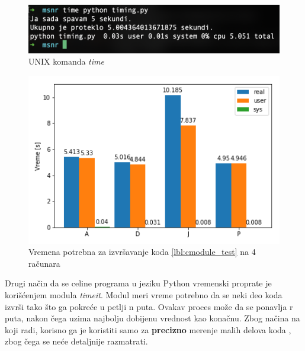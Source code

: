 \documentclass[a4paper]{article}
\begin{document}
\begin{figure}[h!]
\begin{center}
\includegraphics[scale=0.6]{time_python_shell.png}
\end{center}
\caption{UNIX komanda {\em time}}
\label{fig:time_shell}
\end{figure}

\begin{figure}[h!]
\begin{center}
\includegraphics[scale=0.7]{barplot.png}
\end{center}
\caption{Vremena potrebna za izvršavanje koda \ref{lbl:cmodule_test} na 4 računara}
\label{fig:custom_time}
\end{figure}


Drugi način da se celine programa u jeziku Python vremenski proprate je korišćenjem modula {\em timeit}. Modul meri vreme potrebno da se neki deo koda izvrši tako što ga pokreće u petlji n puta. Ovakav proces može da se ponavlja r puta, nakon čega uzima najbolju dobijenu vrednost kao konačnu. Zbog načina na koji radi, korisno ga je koristiti samo za \textbf{precizno} merenje malih delova koda \cite{lanaro2013python}, zbog čega se neće detaljnije razmatrati.
\end{document}
